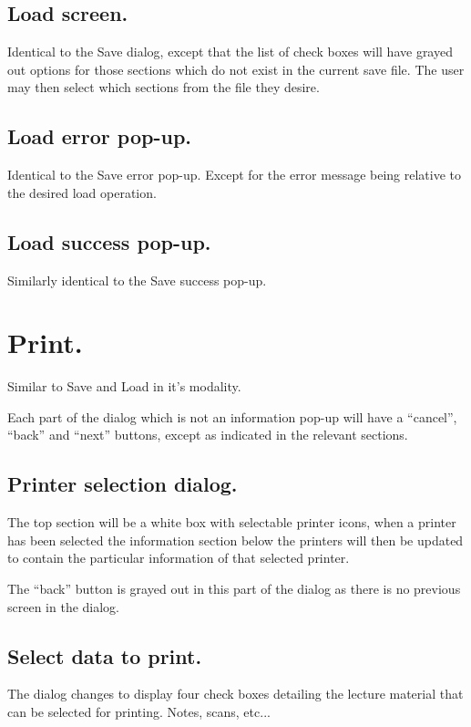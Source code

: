 \subsection{Load screen.}

Identical to the Save dialog, except that the list of check boxes will have grayed out options for those sections which do not exist in the current save file. The user may then select which sections from the file they desire.

\subsection{Load error pop-up.}

Identical to the Save error pop-up. Except for the error message being relative to the desired load operation.

\subsection{Load success pop-up.}

Similarly identical to the Save success pop-up.

\section{Print.}

Similar to Save and Load in it's modality.

Each part of the dialog which is not an information pop-up will have a ``cancel'', ``back'' and ``next'' buttons, except as indicated in the relevant sections.

\subsection{Printer selection dialog.}

The top section will be a white box with selectable printer icons, when a printer has been selected the information section below the printers will then be updated to contain the particular information of that selected printer.

The ``back'' button is grayed out in this part of the dialog as there is no previous screen in the dialog.

\subsection{Select data to print.}

The dialog changes to display four check boxes detailing the lecture material that can be selected for printing. Notes, scans, etc...

